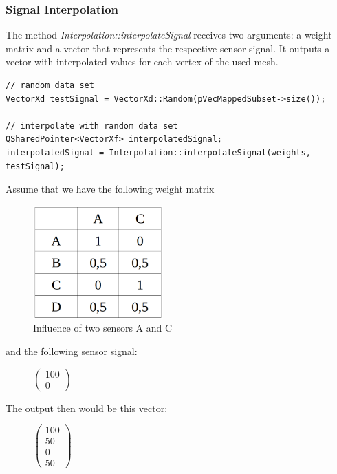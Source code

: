 \subsubsection{Signal Interpolation}

The method \textit{Interpolation::interpolateSignal} receives two arguments: a weight matrix and a vector that represents the respective sensor signal. It outputs a vector with interpolated values for each vertex of the used mesh.

\begin{lstlisting}
// random data set
VectorXd testSignal = VectorXd::Random(pVecMappedSubset->size());

// interpolate with random data set
QSharedPointer<VectorXf> interpolatedSignal;
interpolatedSignal = Interpolation::interpolateSignal(weights, testSignal);
\end{lstlisting}

\clearpage

Assume that we have the following weight matrix
\begin{figure}[h]
	\begin{center}
		\includegraphics[width=5cm]{figures/weights.png}
		\caption{Influence of two sensors A and C}
	\end{center}
\end{figure}

and the following sensor signal:
\begin{figure}[ht]
	\centering
	$\begin{pmatrix}
	100 \\ 0
	\end{pmatrix}$
\end{figure}


The output then would be this vector:
\begin{figure}[ht]
	\centering
	$
	\begin{pmatrix} 100 \\ 50 \\ 0 \\ 50 \end{pmatrix}
	$
\end{figure}

\clearpage


\clearpage


  

